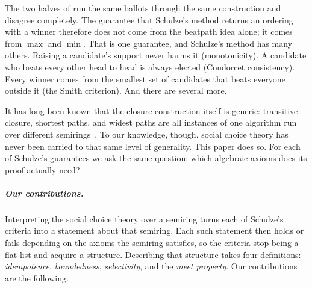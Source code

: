 \documentclass[a4paper,UKenglish,cleveref,autoref,thm-restate,anonymous]{lipics-v2021}
\begin{document}
The two halves of  run the same ballots through the same
construction and disagree completely. The guarantee that Schulze's method
returns an ordering with a winner therefore does not come from the beatpath
idea alone; it comes from $\max$ and $\min$. That is one guarantee, and
Schulze's method has many others. Raising a candidate's support never harms
it (monotonicity). A candidate who beats every other head to head is always
elected (Condorcet consistency). Every winner comes from the smallest set
of candidates that beats everyone outside it (the Smith criterion). And
there are several more.

It has long been known that the closure construction itself is generic:
transitive closure, shortest paths, and widest paths are all instances of
one algorithm run over different
semirings~\cite{carre1971algebra,lehmann1977,10.5555/1386688,baras2022path}.
To our knowledge, though, social choice theory has never been carried to
that same level of generality. This paper does so. For each of Schulze's
guarantees we ask the same question: which algebraic axioms does its proof
actually need?

\subparagraph*{Our contributions.}
Interpreting the social choice theory over a semiring turns each of
Schulze's criteria into a statement about that semiring. Each such
statement then holds or fails depending on the axioms the semiring
satisfies, so the criteria stop being a flat list and acquire a structure.
Describing that structure takes four definitions: \emph{idempotence},
\emph{boundedness}, \emph{selectivity}, and the \emph{meet property}. Our
contributions are the following.
\end{document}
